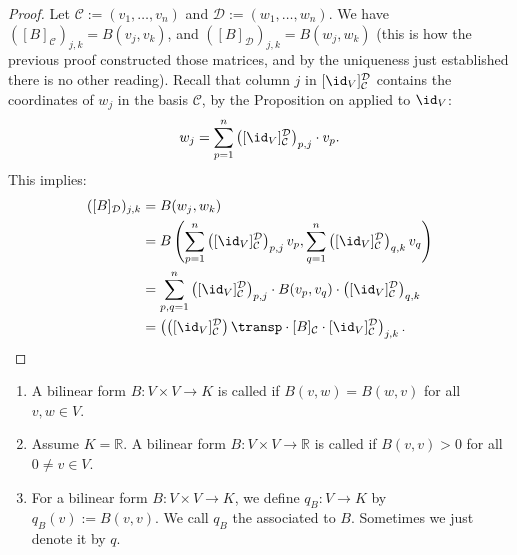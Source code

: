 \begin{proof}
Let $\mathcal{C} := (v_1, \dots, v_n)$ and $\mathcal{D} := (w_1, \dots, w_n)$. We have $([B]_{\mathcal{C}})_{j,k} = B(v_j, v_k)$, and $([B]_{\mathcal{D}})_{j,k} = B(w_j, w_k)$ (this is how the previous proof constructed those matrices, and by the uniqueness just established there is no other reading). Recall that column $j$ in $[\id_V]_{\mathcal{C}}^{\mathcal{D}}$ contains the coordinates of $w_j$ in the basis $\mathcal{C}$, by the Proposition on  applied to $\id_V$:
\[
w_j = \sum_{p=1}^n \left([\id_V]_{\mathcal{C}}^{\mathcal{D}}\right)_{p,j} \cdot v_p.
\]
This implies:
\begin{align*}
([B]_{\mathcal{D}})_{j,k} &= B(w_j, w_k) \\
&= B\left(\sum_{p=1}^n \left([\id_V]_{\mathcal{C}}^{\mathcal{D}}\right)_{p,j} v_p, \sum_{q=1}^n \left([\id_V]_{\mathcal{C}}^{\mathcal{D}}\right)_{q,k} v_q\right) \\
&= \sum_{p,q=1}^n \left([\id_V]_{\mathcal{C}}^{\mathcal{D}}\right)_{p,j} \cdot B(v_p, v_q) \cdot \left([\id_V]_{\mathcal{C}}^{\mathcal{D}}\right)_{q,k} \\
&= \left(\left([\id_V]_{\mathcal{C}}^{\mathcal{D}}\right)\transp \cdot [B]_{\mathcal{C}} \cdot [\id_V]_{\mathcal{C}}^{\mathcal{D}}\right)_{j,k}.
\end{align*}
\end{proof}

\begin{definition}
\label{def:symmetric_positive_definite_quadratic}
\leavevmode
\begin{enumerate}[label=\textbf{(\alph*)}]
    \item A bilinear form $B \colon V \times V \to K$ is called  if $B(v, w) = B(w, v)$ for all $v, w \in V$.
    \item Assume $K = \mathbb{R}$. A bilinear form $B \colon V \times V \to \mathbb{R}$ is called  if $B(v, v) > 0$ for all $0 \neq v \in V$.
    \item For a bilinear form $B \colon V \times V \to K$, we define $q_B \colon V \to K$ by $q_B(v) := B(v, v)$. We call $q_B$ the  associated to $B$. Sometimes we just denote it by $q$.
\end{enumerate}
\end{definition}

